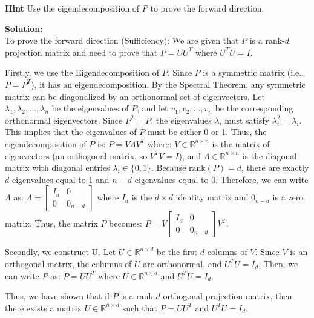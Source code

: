 \documentclass{article}
\newenvironment{solution}{\color{blue} \smallskip \textbf{Solution:}}{}
\begin{document}
\begin{enumerate}[(a)]
    {\bf Hint} Use the eigendecomposition of $P$ to prove the forward direction.
    
    \begin{solution} \\
To prove the forward direction (Sufficiency): We are given that \( P \) is a rank-\( d \) projection matrix and need to prove that \( P = U U^T \) where \( U^T U = I \).

Firstly, we use the Eigendecomposition of \( P \). Since \( P \) is a symmetric matrix (i.e., \( P = P^T \)), it has an eigendecomposition. By the Spectral Theorem, any symmetric matrix can be diagonalized by an orthonormal set of eigenvectors. Let \( \lambda_1, \lambda_2, \dots, \lambda_n \) be the eigenvalues of \( P \), and let \( v_1, v_2, \dots, v_n \) be the corresponding orthonormal eigenvectors. Since \( P^2 = P \), the eigenvalues \( \lambda_i \) must satisfy \( \lambda_i^2 = \lambda_i \). This implies that the eigenvalues of \( P \) must be either 0 or 1. Thus, the eigendecomposition of \( P \) is: \( P = V \Lambda V^T \) where: \( V \in \mathbb{R}^{n \times n} \) is the matrix of eigenvectors (an orthogonal matrix, so \( V^T V = I \)), and \( \Lambda \in \mathbb{R}^{n \times n} \) is the diagonal matrix with diagonal entries \( \lambda_i \in \{0, 1\} \). Because \( \text{rank}(P) = d \), there are exactly \( d \) eigenvalues equal to 1 and \( n - d \) eigenvalues equal to 0. Therefore, we can write \( \Lambda \) as: \( \Lambda = \begin{bmatrix} I_d & 0 \\ 0 & 0_{n-d} \end{bmatrix} \) where \( I_d \) is the \( d \times d \) identity matrix and \( 0_{n-d} \) is a zero matrix. Thus, the matrix \( P \) becomes: \( P = V \begin{bmatrix} I_d & 0 \\ 0 & 0_{n-d} \end{bmatrix} V^T \).

Secondly, we construct U. Let \( U \in \mathbb{R}^{n \times d} \) be the first \( d \) columns of \( V \). Since \( V \) is an orthogonal matrix, the columns of \( U \) are orthonormal, and \( U^T U = I_d \). Then, we can write \( P \) as: \( P = U U^T \) where \( U \in \mathbb{R}^{n \times d} \) and \( U^T U = I_d \). 

Thus, we have shown that if \( P \) is a rank-\( d \) orthogonal projection matrix, then there exists a matrix \( U \in \mathbb{R}^{n \times d} \) such that \( P = U U^T \) and \( U^T U = I_d \).\\\\


\end{solution}
\end{enumerate}
\end{document}
